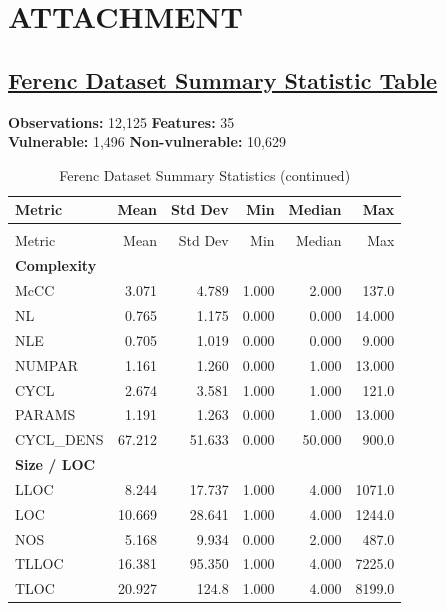 \chapter{ATTACHMENT}

\section[Ferenc Dataset Summary Statistic Table]{\href{https://www.inf.u-szeged.hu/~ferenc/papers/JSVulnerabilityDataSet/}{Ferenc Dataset Summary Statistic Table}}

\noindent\textbf{Observations:} 12,125 \quad
\textbf{Features:} 35\\
\noindent\textbf{Vulnerable:} 1,496 \quad
\textbf{Non-vulnerable:} 10,629

\small
\begin{longtable}{@{}lrrrrr@{}}
\caption{Ferenc Dataset Summary Statistics}\label{tab:ferenc-dataset-statistics}\\
\toprule
Metric & Mean & Std Dev & Min & Median & Max \\
\midrule
\endfirsthead
\caption[]{Ferenc Dataset Summary Statistics (continued)}\\
\toprule
Metric & Mean & Std Dev & Min & Median & Max \\
\midrule
\endhead
\bottomrule
\endfoot
\textbf{Complexity} & & & & & \\
McCC & 3.071 & 4.789 & 1.000 & 2.000 & 137.0 \\
NL & 0.765 & 1.175 & 0.000 & 0.000 & 14.000 \\
NLE & 0.705 & 1.019 & 0.000 & 0.000 & 9.000 \\
NUMPAR & 1.161 & 1.260 & 0.000 & 1.000 & 13.000 \\
CYCL & 2.674 & 3.581 & 1.000 & 1.000 & 121.0 \\
PARAMS & 1.191 & 1.263 & 0.000 & 1.000 & 13.000 \\
CYCL\_DENS & 67.212 & 51.633 & 0.000 & 50.000 & 900.0 \\
\addlinespace
\textbf{Size / LOC} & & & & & \\
LLOC & 8.244 & 17.737 & 1.000 & 4.000 & 1071.0 \\
LOC & 10.669 & 28.641 & 1.000 & 4.000 & 1244.0 \\
NOS & 5.168 & 9.934 & 0.000 & 2.000 & 487.0 \\
TLLOC & 16.381 & 95.350 & 1.000 & 4.000 & 7225.0 \\
TLOC & 20.927 & 124.8 & 1.000 & 4.000 & 8199.0 \\

\end{longtable}
